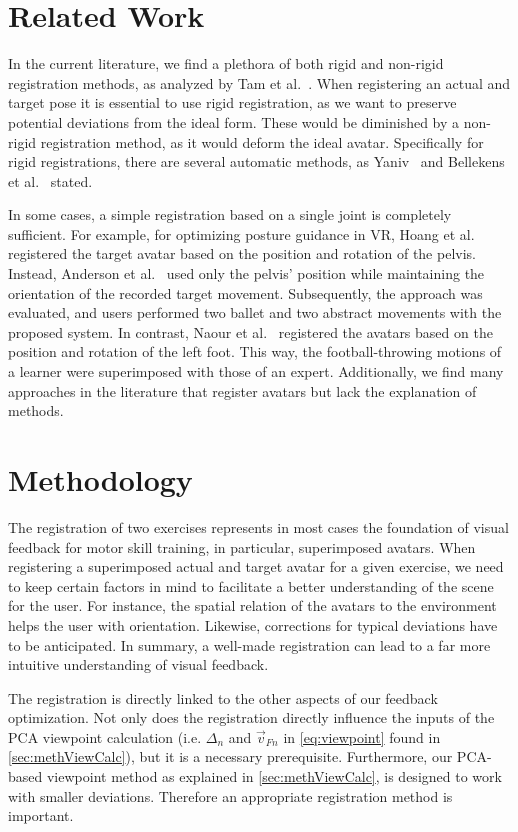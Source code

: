 \section{Related Work \label{sec:relReg}}
In the current literature, we find a plethora of both rigid and non-rigid registration methods, as analyzed by Tam et al.~\cite{tam2012registration}. When registering an actual and target pose it is essential to use rigid registration, as we want to preserve potential deviations from the ideal form. These would be diminished by a non-rigid registration method, as it would deform the ideal avatar. Specifically for rigid registrations, there are several automatic methods, as Yaniv~\cite{yaniv2008rigid} and Bellekens et al.~\cite{bellekens2014survey} stated.

In some cases, a simple registration based on a single joint is completely sufficient. For example, for optimizing posture guidance in VR, Hoang et al.~\cite{hoang2016onebody} registered the target avatar based on the position and rotation of the pelvis. Instead, Anderson et al.~\cite{anderson2013youmove} used only the pelvis' position while maintaining the orientation of the recorded target movement. Subsequently, the approach was evaluated, and users performed two ballet and two abstract movements with the proposed system. In contrast, Naour et al.~\cite{naour2019superimpose} registered the avatars based on the position and rotation of the left foot. This way, the football-throwing motions of a learner were superimposed with those of an expert. Additionally, we find many approaches in the literature that register avatars but lack the explanation of methods.

\section{Methodology \label{sec:methReg}}
The registration of two exercises represents in most cases the foundation of visual feedback for motor skill training, in particular, superimposed avatars. When registering a superimposed actual and target avatar for a given exercise, we need to keep certain factors in mind to facilitate a better understanding of the scene for the user. For instance, the spatial relation of the avatars to the environment helps the user with orientation. Likewise, corrections for typical deviations have to be anticipated. In summary, a well-made registration can lead to a far more intuitive understanding of visual feedback.

The registration is directly linked to the other aspects of our feedback optimization. Not only does the registration directly influence the inputs of the PCA viewpoint calculation (i.e. $\Delta_n$ and  $\vec{v}_{Fn}$ in \autoref{eq:viewpoint} found in \autoref{sec:methViewCalc}), but it is a necessary prerequisite. Furthermore, our PCA-based viewpoint method as explained in \autoref{sec:methViewCalc}, is designed to work with smaller deviations. Therefore an appropriate registration method is important.

